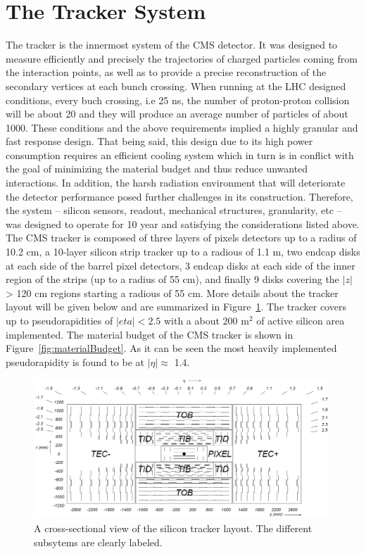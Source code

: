 \section{The Tracker System}
The tracker is the innermost system of the CMS detector.
It was designed to measure efficiently and precisely the trajectories
of charged particles coming from the interaction points, as well as to
provide a precise reconstruction of the secondary vertices at each
bunch crossing. When running at the LHC designed conditions, every
buch crossing, i.e 25 ns, the number of proton-proton collision will
be about 20 and they will produce an average number of particles of about
1000. These conditions and the above requirements implied a highly granular and fast
response design. That being said, this design due to its high power
consumption requires an efficient cooling system which in turn is in
conflict with the goal of minimizing the material budget and thus
reduce unwanted interactions. In addition, the harsh radiation
environment that will deteriorate the detector performance posed
further challenges in its construction. Therefore, the system --
silicon sensors, readout, mechanical structures, granularity, etc --
was designed to operate for 10 year and satisfying the considerations
listed above. The CMS tracker is composed of three layers of pixels
detectors up to a radius of 10.2 cm, a 10-layer silicon strip tracker
up to a radious of 1.1 m, two endcap disks at each side of the barrel pixel detectors, 3
endcap disks at each side of the inner region of the strips (up to a
radius of 55 cm), and finally 9 disks covering the $|z|$ > 120 cm
regions starting a radious of 55 cm. More details about the tracker
layout will be given below and are summarized in
Figure~\ref{fig:trackerlayout}. The tracker covers up to
pseudorapidities of $|eta| < 2.5$ with a about 200 m$^2$ of active
silicon area implemented. The material budget of the CMS tracker is
shown in Figure~\ref{fig:materialBudget}. As it can be seen the most
heavily implemented pseudorapidity is found to be at $|\eta|\approx$ 1.4.
\begin{figure}
 \centering
\includegraphics[width=0.99\textwidth]{CMS_DetectorFigures/TrackerLayout.png}
 \caption{A cross-sectional view of the silicon tracker layout. The
   different subsytems are clearly labeled.\label{fig:trackerlayout}}
\end{figure}
